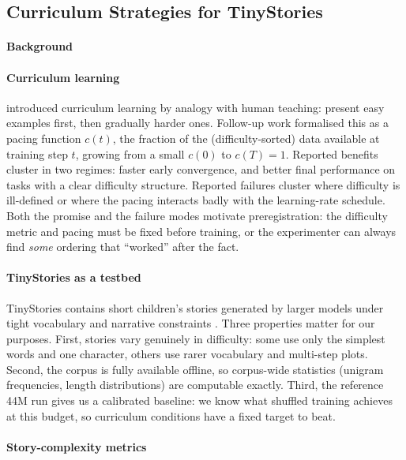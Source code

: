 \subsection{Curriculum Strategies for TinyStories}
\label{ch-curriculum}

\paragraph{Background}

\paragraph{Curriculum learning}

\citet{bengio2009curriculum} introduced curriculum learning by analogy
with human teaching: present easy examples first, then gradually harder
ones. Follow-up work formalised this as a pacing function $c(t)$, the
fraction of the (difficulty-sorted) data available at training step $t$,
growing from a small $c(0)$ to $c(T) = 1$. Reported benefits cluster in
two regimes: faster early convergence, and better final performance on
tasks with a clear difficulty structure. Reported failures cluster where
difficulty is ill-defined or where the pacing interacts badly with the
learning-rate schedule. Both the promise and the failure modes motivate
preregistration: the difficulty metric and pacing must be fixed before
training, or the experimenter can always find \emph{some} ordering that
``worked'' after the fact.

\paragraph{TinyStories as a testbed}

TinyStories contains short children's stories generated by larger models
under tight vocabulary and narrative constraints \citep{eldan2023tinystories}.
Three properties matter for our purposes. First, stories vary genuinely
in difficulty: some use only the simplest words and one character, others
use rarer vocabulary and multi-step plots. Second, the corpus is fully
available offline, so corpus-wide statistics (unigram frequencies, length
distributions) are computable exactly. Third, the reference 44M run gives
us a calibrated baseline: we know what shuffled training achieves at this
budget, so curriculum conditions have a fixed target to beat.

\paragraph{Story-complexity metrics}

